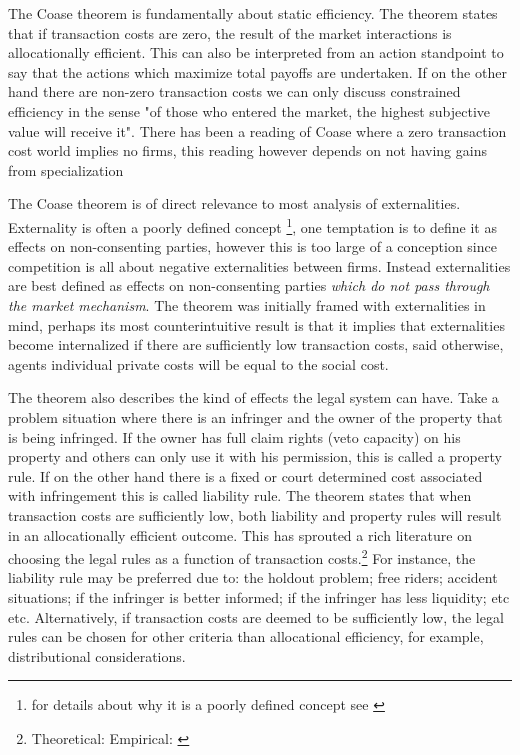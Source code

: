 \documentclass[12pt]{article}
\numberwithin{equation}{section}
\begin{document}
The Coase theorem is fundamentally about static efficiency. The theorem states that if transaction costs are zero, the result of the market interactions is allocationally efficient. This can also be interpreted from an action standpoint to say that the actions which maximize total payoffs are undertaken. If on the other hand there are non-zero transaction costs we can only discuss constrained efficiency in the sense "of those who entered the market, the highest subjective value will receive it". There has been a reading of Coase where a zero transaction cost world implies no firms, this reading however depends on not having gains from specialization \cite{demsetz2011rh}

The Coase theorem is of direct relevance to most analysis of externalities. Externality is often a poorly defined concept \footnote{for details about why it is a poorly defined concept see \cite{Cheung1970}}, one temptation is to define it as effects on non-consenting parties, however this is too large of a conception since competition is all about negative externalities between firms. Instead externalities are best defined as effects on non-consenting parties \textit{which do not pass through the market mechanism}. The theorem was initially framed with externalities in mind, perhaps its most counterintuitive result is that it implies that externalities become internalized if there are sufficiently low transaction costs, said otherwise, agents individual private costs will be equal to the social cost.

The theorem also describes the kind of effects the legal system can have. Take a problem situation where there is an infringer and the owner of the property that is being infringed. If the owner has full claim rights (veto capacity) on his property and others can only use it with his permission, this is called a property rule. If on the other hand there is a fixed or court determined cost associated with infringement this is called liability rule. The theorem states that when transaction costs are sufficiently low, both liability and property rules will result in an allocationally efficient outcome. This has sprouted a rich literature on choosing the legal rules as a function of transaction costs.\footnote{Theoretical: \cite{calabresi1972property} Empirical: \cite{kaplow1995property}} For instance, the liability rule may be preferred due to: the holdout problem; free riders; accident situations; if the infringer is better informed; if the infringer has less liquidity; etc etc. Alternatively, if transaction costs are deemed to be sufficiently low, the legal rules can be chosen for other criteria than allocational efficiency, for example, distributional considerations.
\end{document}
